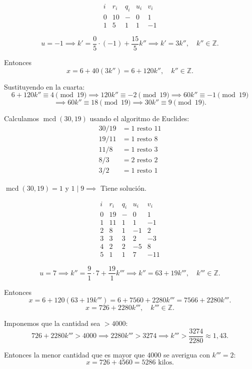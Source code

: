 \documentclass[a4paper,12pt]{article}
\begin{document}
\begin{ejercicio}[title=Ejercicio 40]

\[
\begin{array}{c|c|c|c|c}
i & r_i & q_i & u_i & v_i \\
\hline
0 & 10 & - & 0 & 1 \\
1 & \boxed{5} & 1 & 1 & -1
\end{array}
\]

\[
u = -1 \implies k' = \frac{0}{5} \cdot (-1) + \frac{15}{5} k'' \implies k' = 3 k'', \quad k'' \in \mathbb{Z}.
\]

Entonces
\[
x = 6 + 40(3k'') = 6 + 120 k'', \quad k'' \in \mathbb{Z}.
\]

Sustituyendo en la cuarta:
\[
6 + 120 k'' \equiv 4 \pmod{19} \implies 120 k'' \equiv -2 \pmod{19} \implies 60 k'' \equiv -1 \pmod{19}
\]
\[
\implies 60 k'' \equiv 18 \pmod{19} \implies 30 k'' \equiv 9 \pmod{19}.
\]

Calculamos \(\operatorname{mcd}(30,19)\) usando el algoritmo de Euclides:
\begin{align*}
30 / 19 &= 1 \text{ resto } 11 \\
19 / 11 &= 1 \text{ resto } 8 \\
11 / 8  &= 1 \text{ resto } 3 \\
8 / 3   &= 2 \text{ resto } 2 \\
3 / 2   &= 1 \text{ resto } \boxed{1}
\end{align*}

\(\operatorname{mcd}(30,19) = 1\) y \(1 \mid 9 \implies\) Tiene solución.

\[
\begin{array}{c|c|c|c|c}
i & r_i & q_i & u_i & v_i \\
\hline
0 & 19 & - & 0 & 1 \\
1 & 11 & 1 & 1 & -1 \\
2 & 8 & 1 & -1 & 2 \\
3 & 3 & 3 & 2 & -3 \\
4 & 2 & 2 & -5 & 8 \\
5 & \boxed{1} & 1 & 7 & -11
\end{array}
\]

\[
u = 7 \implies k'' = \frac{9}{1}\cdot 7 + \frac{19}{1} k''' \implies k'' = 63 + 19 k''', \quad k''' \in \mathbb{Z}.
\]

Entonces
\[
x = 6 + 120 (63 + 19 k''') = 6 + 7560 + 2280 k''' = 7566 + 2280 k'''.
\]
\[
x = 726 + 2280 k''', \quad k''' \in \mathbb{Z}.
\]

Imponemos que la cantidad sea \(>4000\):
\[
726 + 2280 k''' > 4000 \implies 2280 k''' > 3274 \implies k''' > \frac{3274}{2280} \approx 1,43.
\]

Entonces la menor cantidad que es mayor que \(4000\) se averigua con \(k''' = 2\):
\[
x = 726 + 4560 = \boxed{5286 \text{ kilos}}.
\]

\end{ejercicio}
\end{document}
